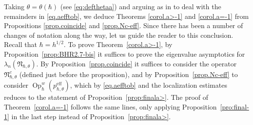 \documentclass[10pt]{amsart}
\newcommand{\eff}{\mathrm{eff}}
\DeclareMathOperator{\Op}{Op}
\theoremstyle{plain}
\theoremstyle{definition}
\begin{document}
Taking $\theta=\theta(\hbar)$ (see \eqref{eq:defthetaa}) and arguing as in \cite[\S 8.3]{BLTRS21} to deal with the remainders in \eqref{eq.aefftob}, we deduce Theorems \ref{corol.a>-1} and \ref{corol.a=-1} from Propositions \ref{prop.coincide} and \ref{prop.Nc-eff}.
Since there has been a number of changes of notation along the way, let us guide the reader to this conclusion.
Recall that $\hbar=h^{1/2}$. To prove Theorem~\ref{corol.a>-1}, by Proposition~\ref{prop:BHR2.7-bis} it suffices to prove the eigenvalue asymptotics for $\lambda_n(\mathfrak N_{\hbar,\theta})$.
By Proposition~\ref{prop.coincide} it suffices to consider the operator $\mathfrak{N}^c_{\hbar,\theta}$ (defined just before the proposition), and by Proposition~\ref{prop.Nc-eff} to consider $\Op^w_\hbar (p^{\eff}_{\hbar,\theta})$, which by \eqref{eq.aefftob} and the localization estimates reduces to the statement of Proposition~\ref{prop:finala>}.
The proof of Theorem~\ref{corol.a=-1} follows the same lines, only applying Proposition~\ref{pro:final-1} in the last step instead of Proposition~\ref{prop:finala>}.
\end{document}

